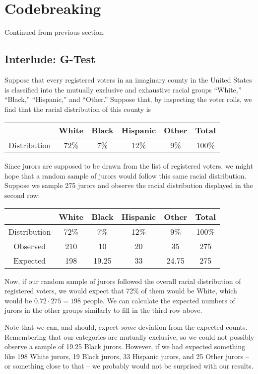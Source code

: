 \documentclass[letterpaper]{article}
\begin{document}
\section{Codebreaking}
Continued from previous section.

\subsection{Interlude: G-Test}
Suppose that every registered voters in an imaginary county in the United States is classified into the mutually exclusive and exhaustive racial groups ``White,'' ``Black,'' ``Hispanic,'' and ``Other.'' Suppose that, by inspecting the voter rolls, we find that the racial distribution of this county is 
\begin{center}
    \begin{tabular}{c|c c c c c}
            & White & Black & Hispanic & Other & Total \\
        \hline  
        Distribution & 72\% & 7\% & 12\% & 9\% & 100\%
    \end{tabular}
\end{center}
Since jurors are supposed to be drawn from the list of registered voters, we might hope that a random sample of jurors would follow this same racial distribution. Suppose we sample 275 jurors and observe the racial distribution displayed in the second row:
\begin{center}
    \begin{tabular}{c|c c c c c}
            & White & Black & Hispanic & Other & Total \\
        \hline  
        Distribution & 72\% & 7\% & 12\% & 9\% & 100\% \\ 
        Observed & 210 & 10 & 20 & 35 & 275 \\ 
        Expected & 198 & 19.25 & 33 & 24.75 & 275
    \end{tabular}
\end{center}
Now, if our random sample of jurors followed the overall racial distribution of registered voters, we would expect that 72\% of them would be White, which would be $0.72 \cdot 275 = 198$ people. We can calculate the expected numbers of jurors in the other groups similarly to fill in the third row above.

\bigskip 

Note that we can, and should, expect \emph{some} deviation from the expected counts. Remembering that our categories are mutually exclusive, so we could not possibly observe a sample of 19.25 Black jurors. However, if we had expected something like 198 White jurors, 19 Black jurors, 33 Hispanic jurors, and 25 Other jurors -- or something close to that -- we probably would not be surprised with our results.
\end{document}
